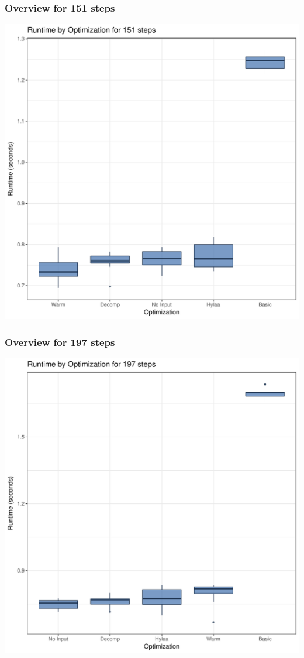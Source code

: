 \documentclass{article}\usepackage[]{graphicx}\usepackage[]{color}
\makeatletter
\def\maxwidth{ %
  \ifdim\Gin@nat@width>\linewidth
    \linewidth
  \else
    \Gin@nat@width
  \fi
}
\newenvironment{knitrout}{}{} %
\makeatother
\begin{document}
\subsubsection{Overview for 151 steps}
\begin{knitrout}
\color{fgcolor}
\includegraphics[width=\maxwidth]{figure/steps151-1} 

\end{knitrout}
\subsubsection{Overview for 197 steps}
\begin{knitrout}
\color{fgcolor}
\includegraphics[width=\maxwidth]{figure/steps197-1} 

\end{knitrout}
\end{document}
